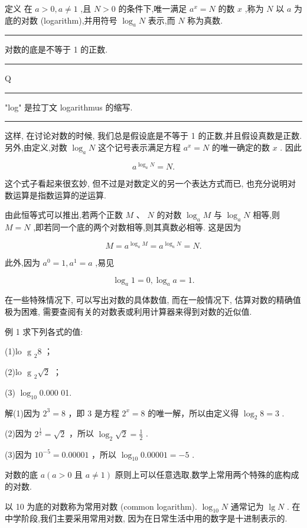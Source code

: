 \documentclass[10pt]{article}
\newcommand{\HRule}{\begin{center}\rule{0.9\linewidth}{0.2mm}\end{center}}
\newcommand*\circled[1]{\tikz[baseline=(char.base)]{\node[shape=circle,draw,inner sep=1.5pt] (char) {\small #1};}}
\begin{document}
定义 在 \(a > 0,a \neq  1\) ,且 \(N > 0\) 的条件下,唯一满足 \({a}^{x} = N\) 的数 \(x\) ,称为 \(N\) 以 \(a\) 为底的对数 (logarithm),并用符号 \({\log }_{a}N\) 表示,而 \(N\) 称为真数.

\HRule

对数的底是不等于 1 的正数.

\HRule

Q

\HRule

"log" 是拉丁文 logarithmus 的缩写.

\HRule

这样, 在讨论对数的时候, 我们总是假设底是不等于 1 的正数,并且假设真数是正数. 另外,由定义,对数 \({\log }_{a}N\) 这个记号表示满足方程 \({a}^{x} = N\) 的唯一确定的数 \(x\) . 因此

\[
{a}^{{\log }_{a}N} = N.
\]
  \circled{2} 



这个式子看起来很玄妙, 但不过是对数定义的另一个表达方式而已, 也充分说明对数运算是指数运算的逆运算.

由此恒等式可以推出,若两个正数 \(M\text{ 、 }N\) 的对数 \({\log }_{a}M\) 与 \({\log }_{a}N\) 相等,则 \(M = N\) ,即若同一个底的两个对数相等,则其真数必相等. 这是因为

\[
M = {a}^{{\log }_{a}M} = {a}^{{\log }_{a}N} = N.
\]

此外,因为 \({a}^{0} = 1,{a}^{1} = a\) ,易见

\[
{\log }_{a}1 = 0,{\log }_{a}a = 1.
\]

在一些特殊情况下, 可以写出对数的具体数值, 而在一般情况下, 估算对数的精确值极为困难, 需要查阅有关的对数表或利用计算器来得到对数的近似值.

例 1 求下列各式的值:

(1)lo \({\text{ g }}_{2}8\) ；

(2)lo \({\text{ g }}_{2}\sqrt{2}\) ；

(3) \({\log }_{10}{0.000}\) 01.

解(1)因为 \({2}^{3} = 8\) ，即 3 是方程 \({2}^{x} = 8\) 的唯一解，所以由定义得 \({\log }_{2}8 = 3\) .

(2)因为 \({2}^{\frac{1}{2}} = \sqrt{2}\) ，所以 \({\log }_{2}\sqrt{2} = \frac{1}{2}\) .

(3)因为 \({10}^{-5} = {0.00001}\) ，所以 \({\log }_{10}{0.00001} =  - 5\) .

对数的底 \(a\left( {a > 0\text{ 且 }a \neq  1}\right)\) 原则上可以任意选取,数学上常用两个特殊的底构成的对数.

以 10 为底的对数称为常用对数 (common logarithm). \({\log }_{10}N\) 通常记为 \(\lg N\) . 在中学阶段,我们主要采用常用对数, 因为在日常生活中用的数字是十进制表示的.
\end{document}
